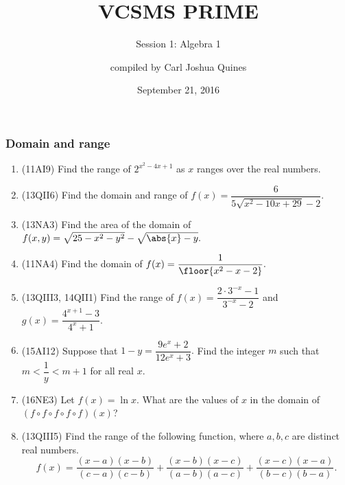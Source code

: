 \documentclass[10pt,paper=letter]{scrartcl}
\begin{document}
\title{VCSMS PRIME}
\subtitle{Session 1: Algebra 1}
\author{compiled by Carl Joshua Quines}
\date{September 21, 2016}

\maketitle

\subsubsection*{Domain and range}

\begin{enumerate}

\item (11AI9) Find the range of $2^{x^2 - 4x + 1}$ as $x$ ranges over the real numbers.

\item (13QII6) Find the domain and range of $f(x) = \dfrac{6}{5\sqrt{x^2 - 10x + 29} - 2}.$

\item (13NA3) Find the area of the domain of $f(x, y) = \sqrt{25 - x^2 - y^2} - \sqrt{\abs{x} - y}.$

\item (11NA4) Find the domain of $f(x) = \dfrac{1}{\floor{x^2-x-2}}.$

\item (13QIII3, 14QII1) Find the range of $f(x) = \dfrac{2 \cdot 3^{-x} -1}{3^{-x} - 2}$ and $g(x) = \dfrac{4^{x+1} - 3}{4^x + 1}.$

\item (15AI12) Suppose that $1-y = \dfrac{9e^x + 2}{12e^x + 3}.$ Find the integer $m$ such that $m < \dfrac{1}{y} < m+1$ for all real $x$.

\item (16NE3) Let $f(x) = \ln x$. What are the values of $x$ in the domain of $(f \circ f \circ f \circ f \circ f)(x)$?



\item (13QIII5) Find the range of the following function, where $a, b, c$ are distinct real numbers. $$f(x) = \frac{(x-a)(x-b)}{(c-a)(c-b)} + \frac{(x-b)(x-c)}{(a-b)(a-c)} + \frac{(x-c)(x-a)}{(b-c)(b-a)}.$$

\end{enumerate}
\end{document}
